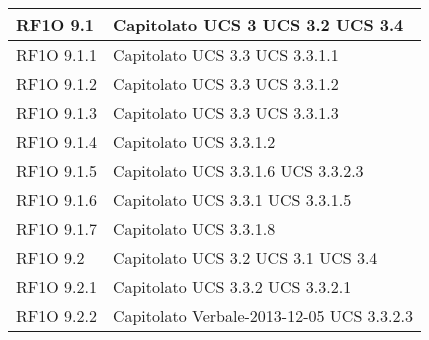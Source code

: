 \begin{center}
\begin{longtable}{ | p{5cm} | p{5cm} |}
				RF1O 9.1 &  Capitolato \newline  UCS 3 \newline  UCS 3.2 \newline  UCS 3.4 \newline  \\ \hline      
				RF1O 9.1.1 &  Capitolato \newline  UCS 3.3 \newline  UCS 3.3.1.1 \newline  \\ \hline      
				RF1O 9.1.2 &  Capitolato \newline  UCS 3.3 \newline  UCS 3.3.1.2 \newline  \\ \hline      
				RF1O 9.1.3 &  Capitolato \newline  UCS 3.3 \newline  UCS 3.3.1.3 \newline  \\ \hline      
				RF1O 9.1.4 &  Capitolato \newline  UCS 3.3.1.2 \newline  \\ \hline      
				RF1O 9.1.5 &  Capitolato \newline  UCS 3.3.1.6 \newline  UCS 3.3.2.3 \newline  \\ \hline      
				RF1O 9.1.6 &  Capitolato \newline  UCS 3.3.1 \newline  UCS 3.3.1.5 \newline  \\ \hline      
				RF1O 9.1.7 &  Capitolato \newline  UCS 3.3.1.8 \newline  \\ \hline      
				RF1O 9.2 &  Capitolato \newline  UCS 3.2 \newline  UCS 3.1 \newline  UCS 3.4 \newline  \\ \hline      
				RF1O 9.2.1 &  Capitolato \newline  UCS 3.3.2 \newline  UCS 3.3.2.1 \newline  \\ \hline      
				RF1O 9.2.2 &  Capitolato \newline  Verbale-2013-12-05 \newline  UCS 3.3.2.3 \newline  \\ \hline      

\end{longtable}
\end{center}
